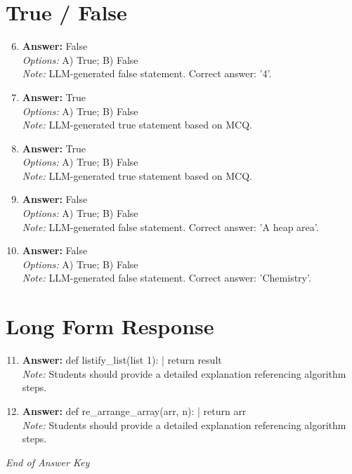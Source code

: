 \documentclass[12pt]{article}
\begin{document}
\section*{True / False}
\begin{enumerate}[label=\arabic*.]
\setcounter{enumi}{5}
\item \textbf{Answer:} False
\\ \textit{Options:} A) True; B) False
\\ \textit{Note:} LLM-generated false statement. Correct answer: '4'.
\item \textbf{Answer:} True
\\ \textit{Options:} A) True; B) False
\\ \textit{Note:} LLM-generated true statement based on MCQ.
\item \textbf{Answer:} True
\\ \textit{Options:} A) True; B) False
\\ \textit{Note:} LLM-generated true statement based on MCQ.
\item \textbf{Answer:} False
\\ \textit{Options:} A) True; B) False
\\ \textit{Note:} LLM-generated false statement. Correct answer: 'A heap area'.
\item \textbf{Answer:} False
\\ \textit{Options:} A) True; B) False
\\ \textit{Note:} LLM-generated false statement. Correct answer: 'Chemistry'.
\end{enumerate}

\section*{Long Form Response}
\begin{enumerate}[label=\arabic*.]
\setcounter{enumi}{10}
\item \textbf{Answer:} def listify\_list(list 1): | return result
\\ \textit{Note:} Students should provide a detailed explanation referencing algorithm steps.
\item \textbf{Answer:} def re\_arrange\_array(arr, n): | return arr
\\ \textit{Note:} Students should provide a detailed explanation referencing algorithm steps.
\end{enumerate}

\vfill
\noindent\textit{End of Answer Key}
\end{document}
